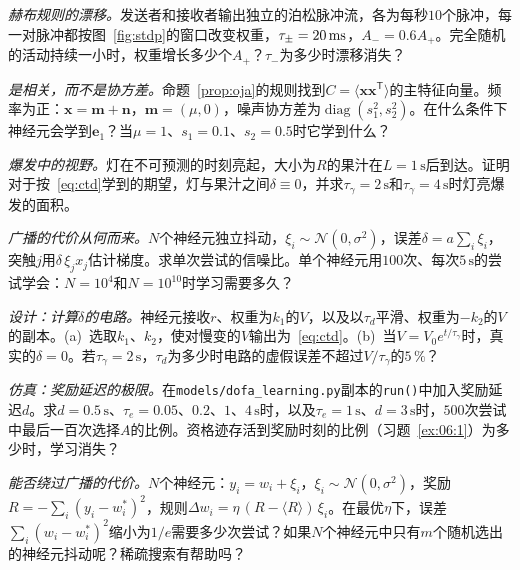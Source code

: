 \begin{exercise}[\lvlA]
\label{ex:06:2}
\emph{赫布规则的漂移。}发送者和接收者输出独立的泊松脉冲流，各为每秒$10$个脉冲，每一对脉冲都按图~\ref{fig:stdp}的窗口改变权重，$\tau_\pm=20\,\text{ms}$，$A_-=0.6A_+$。完全随机的活动持续一小时，权重增长多少个$A_+$？$\tau_-$为多少时漂移消失？
\end{exercise}

\begin{exercise}[\lvlB]
\label{ex:06:3}
\emph{是相关，而不是协方差。}命题~\ref{prop:oja}的规则找到$C=\langle\mathbf x\mathbf x^{\mathsf T}\rangle$的主特征向量。频率为正：$\mathbf x=\mathbf m+\mathbf n$，$\mathbf m=(\mu,0)$，噪声协方差为$\operatorname{diag}(s_1^2,s_2^2)$。在什么条件下神经元会学到$\mathbf e_1$？当$\mu=1$、$s_1=0.1$、$s_2=0.5$时它学到什么？
\end{exercise}

\begin{exercise}[\lvlA]
\label{ex:06:4}
\emph{爆发中的视野。}灯在不可预测的时刻亮起，大小为$R$的果汁在$L=1\,\text{s}$后到达。证明对于按~\eqref{eq:ctd}学到的期望，灯与果汁之间$\delta\equiv0$，并求$\tau_\gamma=2\,\text{s}$和$\tau_\gamma=4\,\text{s}$时灯亮爆发的面积。
\end{exercise}

\begin{exercise}[\lvlB]
\label{ex:06:5}
\emph{广播的代价从何而来。}$N$个神经元独立抖动，$\xi_i\sim\mathcal N(0,\sigma^2)$，误差$\delta=a\sum_i\xi_i$，突触$j$用$\delta\,\xi_jx_j$估计梯度。求单次尝试的信噪比。单个神经元用$100$次、每次$5\,\text{s}$的尝试学会：$N=10^4$和$N=10^{10}$时学习需要多久？
\end{exercise}

\begin{exercise}[\lvlB]
\label{ex:06:6}
\emph{设计：计算$\delta$的电路。}神经元接收$r$、权重为$k_1$的$V$，以及以$\tau_d$平滑、权重为$-k_2$的$V$的副本。(a)~选取$k_1$、$k_2$，使对慢变的$V$输出为~\eqref{eq:ctd}。(b)~当$V=V_0e^{t/\tau_\gamma}$时，真实的$\delta=0$。若$\tau_\gamma=2\,\text{s}$，$\tau_d$为多少时电路的虚假误差不超过$V/\tau_\gamma$的$5\,\%$？
\end{exercise}

\begin{exercise}[\lvlB]
\label{ex:06:7}
\emph{仿真：奖励延迟的极限。}在\texttt{models/\allowbreak dofa\_learning.py}副本的\texttt{run()}中加入奖励延迟$d$。求$d=0.5\,\text{s}$、$\tau_e=0.05$、$0.2$、$1$、$4\,\text{s}$时，以及$\tau_e=1\,\text{s}$、$d=3\,\text{s}$时，$500$次尝试中最后一百次选择$A$的比例。资格迹存活到奖励时刻的比例（习题~\ref{ex:06:1}）为多少时，学习消失？
\end{exercise}

\begin{exercise}[\lvlC]
\label{ex:06:8}
\emph{能否绕过广播的代价。}$N$个神经元：$y_i=w_i+\xi_i$，$\xi_i\sim\mathcal N(0,\sigma^2)$，奖励$R=-\sum_i(y_i-w_i^*)^2$，规则$\Delta w_i=\eta\,(R-\langle R\rangle)\,\xi_i$。在最优$\eta$下，误差$\sum_i(w_i-w_i^*)^2$缩小为$1/e$需要多少次尝试？如果$N$个神经元中只有$m$个随机选出的神经元抖动呢？稀疏搜索有帮助吗？
\end{exercise}
